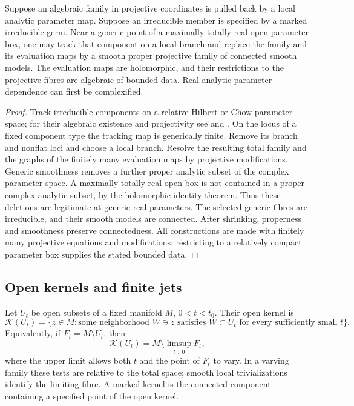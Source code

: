 \begin{lemma}\label{prep:projective-models}
Suppose an algebraic family in projective coordinates is pulled back
by a local analytic parameter map. Suppose an irreducible member is
specified by a marked irreducible germ. Near a generic point of a
maximally totally real open parameter box, one may track that component
on a local branch and replace the family and its evaluation maps by
a smooth proper projective family of connected smooth models.
The evaluation maps are holomorphic, and their restrictions to the
projective fibres are algebraic of bounded data. Real analytic
parameter dependence can first be complexified.
\end{lemma}

\begin{proof}
Track irreducible components on a relative Hilbert or Chow parameter
space; for their algebraic existence and projectivity see
\cite[\S3, Theorems~3.1--3.2]{Grothendieck1961} and
\cite[\S2.4(b), Proposition~4]{AndreottiNorguet1967}. On the locus of a fixed component type the tracking map is
generically finite. Remove its branch and nonflat loci and choose a
local branch. Resolve the resulting total family and the graphs of
the finitely many evaluation maps by projective modifications. Generic
smoothness removes a further proper analytic subset of the complex
parameter space. A maximally totally real open box is not contained
in a proper complex analytic subset, by the holomorphic identity
theorem. Thus these deletions are legitimate at generic real parameters.
The selected generic fibres are irreducible, and their smooth models
are connected. After shrinking, properness and smoothness preserve
connectedness. All constructions are made with finitely many projective
equations and modifications; restricting to a relatively compact
parameter box supplies the stated bounded data.
\end{proof}

\subsection{Open kernels and finite jets}

\begin{definition}\label{prep:kernel}
Let $U_t$ be open subsets of a fixed manifold $M$, $0<t<t_0$. Their
open kernel is
\[
 \mathcal K(U_t)=\{z\in M: \text{some neighborhood }W\ni z
       \text{ satisfies }W\subset U_t
       \text{ for every sufficiently small }t\}.
\]
Equivalently, if $F_t=M\setminus U_t$, then
\[
 \mathcal K(U_t)=M\setminus\limsup_{t\downarrow0}F_t,
\]
where the upper limit allows both $t$ and the point of $F_t$ to vary.
In a varying family these tests are relative to the total space;
smooth local trivializations identify the limiting fibre. A marked
kernel is the connected component containing a specified point of
the open kernel.
\end{definition}

